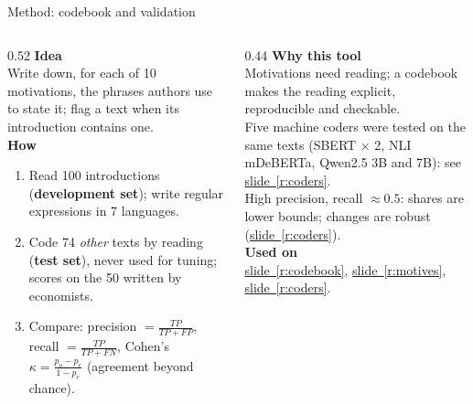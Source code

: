 \documentclass[aspectratio=169,10pt]{beamer}
\newcommand{\usedon}[1]{\hyperref[#1]{\textcolor{c4}{slide~\ref*{#1}}}}
\newcommand{\mhead}[1]{\textcolor{c1}{\textbf{#1}}\\[1pt]}
\begin{document}
\begin{frame}{Method: codebook and validation}
\begin{columns}[T]
\begin{column}{0.52\textwidth}\footnotesize
\mhead{Idea}
Write down, for each of 10 motivations, the phrases authors use to state it; flag a text when its introduction contains one.\\[4pt]
\mhead{How}
\begin{enumerate}\setlength\itemsep{1pt}
\item Read 100 introductions (\textbf{development set}); write regular expressions in 7 languages.
\item Code 74 \emph{other} texts by reading (\textbf{test set}), never used for tuning; scores on the 50 written by economists.
\item Compare: precision $=\frac{TP}{TP+FP}$, recall $=\frac{TP}{TP+FN}$, Cohen's
$\kappa = \frac{p_o-p_e}{1-p_e}$ (agreement beyond chance).
\end{enumerate}
\end{column}
\begin{column}{0.44\textwidth}\footnotesize
\mhead{Why this tool}
Motivations need reading; a codebook makes the reading explicit, reproducible and checkable.\\[3pt]
Five machine coders were tested on the same texts (SBERT $\times$ 2, NLI mDeBERTa, Qwen2.5 3B and 7B): see \usedon{r:coders}.\\[3pt]
High precision, recall $\approx 0.5$: shares are lower bounds; changes are robust (\usedon{r:coders}).\\[6pt]
\mhead{Used on}
\usedon{r:codebook}, \usedon{r:motives}, \usedon{r:coders}.
\end{column}
\end{columns}
\end{frame}
\end{document}
